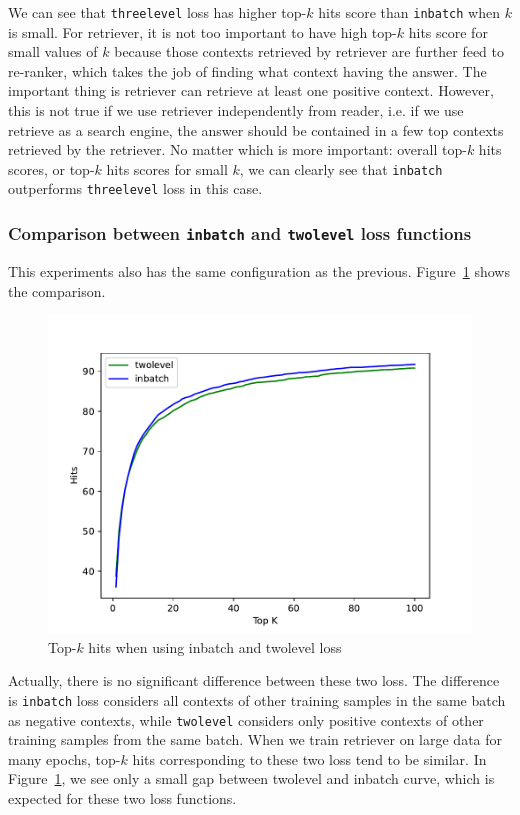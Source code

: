 \documentclass[12pt, sort&compress]{report}
\begin{document}
\par We can see that {\tt threelevel} loss has higher top-$k$ hits score than {\tt inbatch} when $k$ is small. For retriever, it is not too important to have high top-$k$ hits score for small values of $k$ because those contexts retrieved by retriever are further feed to re-ranker, which takes the job of finding what context having the answer. The important thing is retriever can retrieve at least one positive context. However, this is not true if we use retriever independently from reader, i.e. if we use retrieve as a search engine, the answer should be contained in a few top contexts retrieved by the retriever. No matter which is more important: overall top-$k$ hits scores, or top-$k$ hits scores for small $k$, we can clearly see that {\tt inbatch} outperforms {\tt threelevel} loss in this case.%
\subsubsection{Comparison between {\tt inbatch} and {\tt twolevel} loss functions}
\label{sec:4.4.1.2}
This experiments also has the same configuration as the previous. Figure~\ref{fig:13} shows the comparison.
\begin{figure}[!htbp]
	\centering
	\includegraphics[scale=.7]{images/PDF/experiments/inbatch_twolevel_4-1-2.pdf}
	\caption{Top-$k$ hits when using inbatch and twolevel loss}
	\label{fig:13}
\end{figure}
\par Actually, there is no significant difference between these two loss. The difference is {\tt inbatch} loss considers all contexts of other training samples in the same batch as negative contexts, while {\tt twolevel} considers only positive contexts of other training samples from the same batch. When we train retriever on large data for many epochs, top-$k$ hits corresponding to these two loss tend to be similar. In Figure~\ref{fig:13}, we see only a small gap between twolevel and inbatch curve, which is expected for these two loss functions.
\end{document}
